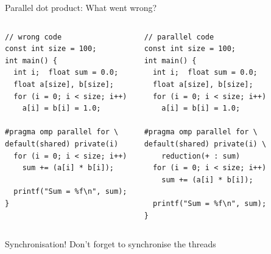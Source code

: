 \documentclass[10pt,times]{beamer}
\begin{document}
\begin{frame}[fragile]{Parallel dot product: What went wrong?}
\begin{columns}
\begin{verbatim}
// wrong code
const int size = 100;
int main() {
  int i;  float sum = 0.0;
  float a[size], b[size];
  for (i = 0; i < size; i++) 
    a[i] = b[i] = 1.0;

#pragma omp parallel for \
default(shared) private(i) 
  for (i = 0; i < size; i++) 
    sum += (a[i] * b[i]);

  printf("Sum = %f\n", sum);
}  
\end{verbatim}
\begin{verbatim}
// parallel code
const int size = 100;
int main() {
  int i;  float sum = 0.0;
  float a[size], b[size];
  for (i = 0; i < size; i++) 
    a[i] = b[i] = 1.0;

#pragma omp parallel for \
default(shared) private(i) \
    reduction(+ : sum)
  for (i = 0; i < size; i++) 
    sum += (a[i] * b[i]);

  printf("Sum = %f\n", sum);
}  
\end{verbatim}
\end{columns}

Synchronisation! Don't forget to synchronise the threads
\end{frame}
\end{document}
